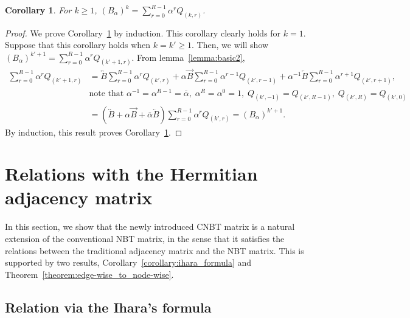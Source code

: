 \documentclass{article}
\theoremstyle{plain}
\newtheorem{corollary}{Corollary}
\begin{document}
\begin{corollary}\label{corollary:power_of_B_alpha}
	For $k\geq 1$, $\displaystyle ( B_{\alpha} )^k = \sum_{r=0}^{R-1} \alpha^r Q_{(k,r)}$.
\end{corollary}

\begin{proof}
	We prove Corollary~\ref{corollary:power_of_B_alpha} by induction.
	This corollary clearly holds for $k=1$.
	Suppose that this corollary holds when $k=k' \geq 1$. Then, we will show $( B_{\alpha} )^{k'+1} = \sum_{r=0}^{R-1} \alpha^{r} Q_{(k'+1,r)}$. From lemma~\ref{lemma:basic2},
	\begin{align*}
		\sum_{r=0}^{R-1} \alpha^{r} Q_{(k'+1,r)} & =
		\overleftrightarrow{B} \sum_{r=0}^{R-1} \alpha^{r} Q_{(k',r)}
		+ \alpha \overrightarrow{B} \sum_{r=0}^{R-1} \alpha^{r-1} Q_{(k',r-1)}
		+ \alpha^{-1} \overleftarrow{B} \sum_{r=0}^{R-1} \alpha^{r+1} Q_{(k', r+1)}
		,                                                                                                                                                                         \\
		                                         & \text{note that }
		\alpha^{-1} = \alpha^{R-1} = \bar{\alpha},\;
		\alpha^{R} = \alpha^{0} = 1,\;
		Q_{(k',-1)} = Q_{(k',R-1)},\;
		Q_{(k',R)} = Q_{(k',0)}
		\\
		                                         & = (\overleftrightarrow{B} + \alpha \overrightarrow{B} + \bar{\alpha} \overleftarrow{B}) \sum_{r=0}^{R-1} \alpha^{r} Q_{(k',r)}
		= ( B_{\alpha} )^{k'+1}
		.
	\end{align*}
	By induction, this result proves Corollary~\ref{corollary:power_of_B_alpha}.
\end{proof}

\section{Relations with the Hermitian adjacency matrix}\label{section:relation_with_herm_adj_mat}

In this section, we show that the newly introduced CNBT matrix is a natural extension of the conventional NBT matrix,
in the sense that it satisfies the relations between the traditional adjacency matrix and the NBT matrix.
This is supported by two results, Corollary~\ref{corollary:ihara_formula} and Theorem~\ref{theorem:edge-wise_to_node-wise}.

\subsection{Relation via the Ihara's formula}
\end{document}
